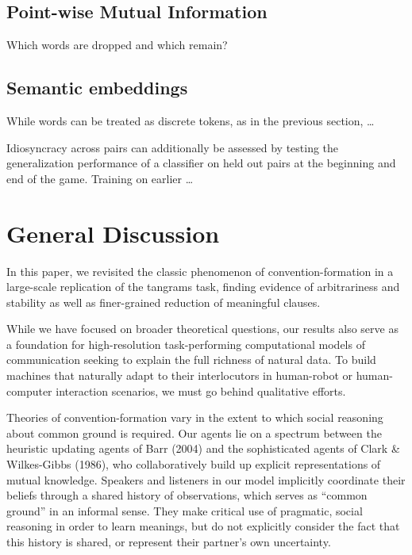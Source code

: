\documentclass[alpha-refs]{wiley-article}
\begin{document}
\subsection{Point-wise Mutual Information}

Which words are dropped and which remain?

\subsection{Semantic embeddings}\label{arbitrariness-and-stability}

While words can be treated as discrete tokens, as in the previous section, \dots

Idiosyncracy across pairs can additionally be assessed by testing the generalization performance of a classifier on held out pairs at the beginning and end of the game. Training on earlier \dots

\section{General Discussion}\label{general-discussion}

In this paper, we revisited the classic phenomenon of
convention-formation in a large-scale replication of the tangrams task,
finding evidence of arbitrariness and stability as well as finer-grained
reduction of meaningful clauses. 

While we have focused on broader theoretical questions, our results also serve as a foundation for high-resolution task-performing computational models of communication seeking to explain the full richness of natural data. To build machines that naturally adapt to their interlocutors in human-robot or human-computer interaction scenarios, we must go behind qualitative efforts.

Theories of convention-formation vary in the extent to which social
reasoning about common ground is required. Our agents lie on a spectrum
between the heuristic updating agents of Barr (2004) and the
sophisticated agents of Clark \& Wilkes-Gibbs (1986), who
collaboratively build up explicit representations of mutual knowledge.
Speakers and listeners in our model implicitly coordinate their beliefs
through a shared history of observations, which serves as ``common
ground'' in an informal sense. They make critical use of pragmatic,
social reasoning in order to learn meanings, but do not explicitly
consider the fact that this history is shared, or represent their
partner's own uncertainty.
\end{document}

